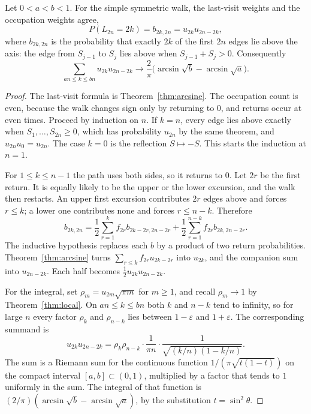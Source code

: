 \begin{theorem}\label{thm:arcsinelimit}
Let $0<a<b<1$. For the simple symmetric walk, the last-visit weights and the occupation weights agree,
\[
 P(L_{2n}=2k)=b_{2k,2n}=u_{2k}u_{2n-2k},
\]
where $b_{2k,2n}$ is the probability that exactly $2k$ of the first $2n$ edges lie above the axis: the edge from $S_{j-1}$ to $S_j$ lies above when $S_{j-1}+S_j>0$. Consequently
\[
 \sum_{an\le k\le bn}u_{2k}u_{2n-2k}\longrightarrow\frac2\pi\bigl(\arcsin\sqrt b-\arcsin\sqrt a\bigr).
\]
\end{theorem}
\begin{proof}
The last-visit formula is Theorem~\ref{thm:arcsine}. The occupation count is even, because the walk changes sign only by returning to $0$, and returns occur at even times. Proceed by induction on $n$. If $k=n$, every edge lies above exactly when $S_1,\ldots,S_{2n}\ge 0$, which has probability $u_{2n}$ by the same theorem, and $u_{2n}u_0=u_{2n}$. The case $k=0$ is the reflection $S\mapsto -S$. This starts the induction at $n=1$.

For $1\le k\le n-1$ the path uses both sides, so it returns to $0$. Let $2r$ be the first return. It is equally likely to be the upper or the lower excursion, and the walk then restarts. An upper first excursion contributes $2r$ edges above and forces $r\le k$; a lower one contributes none and forces $r\le n-k$. Therefore
\[
 b_{2k,2n}=\frac12\sum_{r=1}^k f_{2r}b_{2k-2r,2n-2r}+\frac12\sum_{r=1}^{n-k}f_{2r}b_{2k,2n-2r}.
\]
The inductive hypothesis replaces each $b$ by a product of two return probabilities. Theorem~\ref{thm:arcsine} turns $\sum_{r\le k}f_{2r}u_{2k-2r}$ into $u_{2k}$, and the companion sum into $u_{2n-2k}$. Each half becomes $\frac12 u_{2k}u_{2n-2k}$.

For the integral, set $\rho_m=u_{2m}\sqrt{\pi m}$ for $m\ge 1$, and recall $\rho_m\to 1$ by Theorem~\ref{thm:local}. On $an\le k\le bn$ both $k$ and $n-k$ tend to infinity, so for large $n$ every factor $\rho_k$ and $\rho_{n-k}$ lies between $1-\varepsilon$ and $1+\varepsilon$. The corresponding summand is
\[
 u_{2k}u_{2n-2k}=\rho_k\rho_{n-k}\cdot\frac1{\pi n}\cdot\frac1{\sqrt{(k/n)(1-k/n)}}.
\]
The sum is a Riemann sum for the continuous function $1/(\pi\sqrt{t(1-t)})$ on the compact interval $[a,b]\subset(0,1)$, multiplied by a factor that tends to $1$ uniformly in the sum. The integral of that function is $(2/\pi)(\arcsin\sqrt b-\arcsin\sqrt a)$, by the substitution $t=\sin^2\theta$.
\end{proof}

